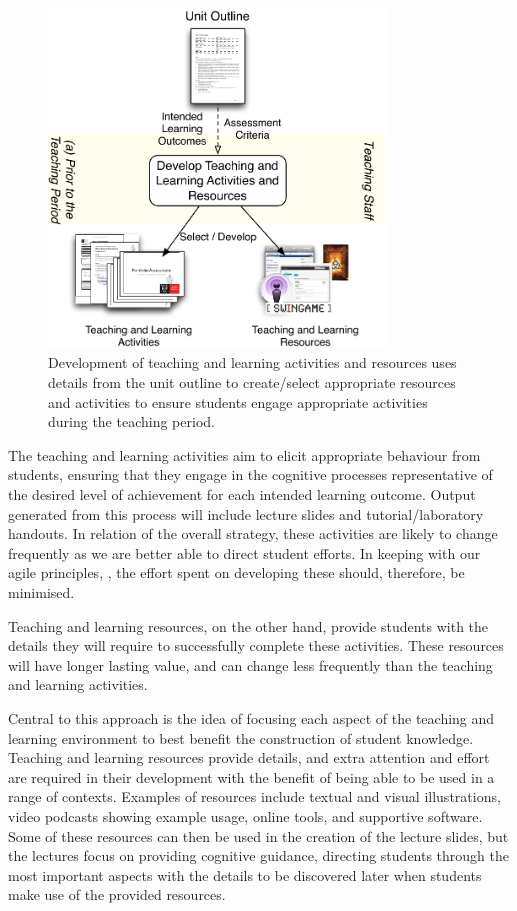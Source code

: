 \begin{figure}[htbp]
	\centering
	\includegraphics[width=0.8\textwidth]{DevelopTLAR}
	\caption{Development of teaching and learning activities and resources uses details from the unit outline to create/select appropriate resources and activities to ensure students engage appropriate activities during the teaching period.}
	\label{fig:develop_tlar}
\end{figure}

The teaching and learning activities aim to elicit appropriate behaviour from students, ensuring that they engage in the cognitive processes representative of the desired level of achievement for each intended learning outcome. Output generated from this process will include lecture slides and tutorial/laboratory handouts. In relation of the overall strategy, these activities are likely to change frequently as we are better able to direct student efforts. In keeping with our agile principles, , the effort spent on developing these should, therefore, be minimised.

Teaching and learning resources, on the other hand, provide students with the details they will require to successfully complete these activities. These resources will have longer lasting value, and can change less frequently than the teaching and learning activities. 

Central to this approach is the idea of focusing each aspect of the teaching and learning environment to best benefit the construction of student knowledge. Teaching and learning resources provide details, and extra attention and effort are required in their development with the benefit of being able to be used in a range of contexts. Examples of resources include textual and visual illustrations, video podcasts showing example usage, online tools, and supportive software. Some of these resources can then be used in the creation of the lecture slides, but the lectures focus on providing cognitive guidance, directing students through the most important aspects with the details to be discovered later when students make use of the provided resources.

